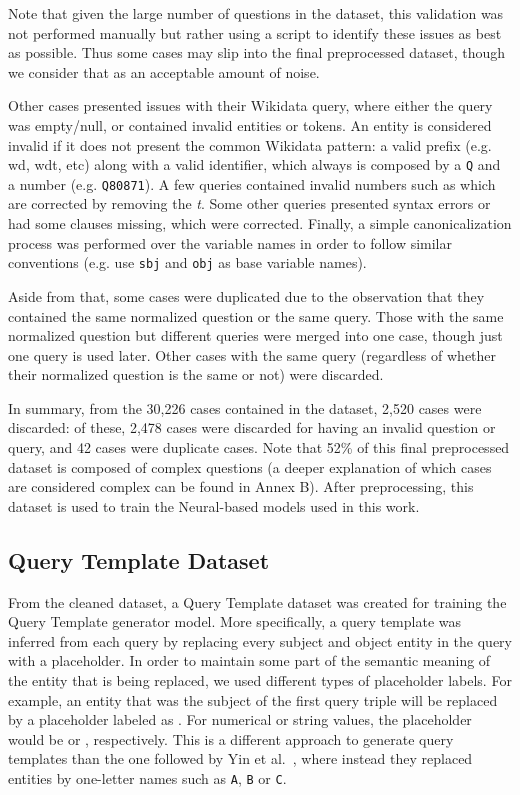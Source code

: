 Note that given the large number of questions in the dataset, this validation was not performed 
manually but rather using a script to identify these issues as best as possible. Thus some cases 
may slip into the final preprocessed dataset, though we consider that as an acceptable amount of 
noise.

Other cases presented issues with their Wikidata \SPARQL{} query, where either the query was 
empty/null, or contained invalid entities or tokens. An entity is considered invalid if it does 
not present the common Wikidata pattern: a valid prefix (e.g. wd, wdt, etc) along with a valid 
identifier, which always is composed by a \texttt{Q} and a number (e.g. \texttt{Q80871}). A few 
queries contained invalid numbers such as  which are corrected by removing the 
\textit{t}. Some other queries presented syntax errors or had some clauses missing, which were 
corrected. Finally, a simple canonicalization process was performed over the variable names in 
order to follow similar conventions (e.g. use \texttt{sbj} and \texttt{obj} as base variable 
names).

Aside from that, some cases were duplicated due to the observation that they contained the same 
normalized question or the same \SPARQL{} query. Those with the same normalized question but 
different \SPARQL{} queries were merged into one case, though just one \SPARQL{} query is used later. 
Other cases with the same \SPARQL{} query (regardless of whether their normalized question is the 
same or not) were discarded.

In summary, from the 30,226 cases contained in the \LCQuADtwo{} dataset, 2,520 cases were 
discarded: of these, 2,478 cases were discarded for having an invalid question or query, and 42 
cases were duplicate cases. Note that 52\% of this final preprocessed dataset is composed of 
complex questions (a deeper explanation of which cases are considered complex can be found in 
Annex B). After preprocessing, this dataset is used to train the Neural-based models used in 
this work.

\subsection{Query Template Dataset}
\label{cap4:experimentalDesign/QaDataset/queryTemplate}
From the cleaned \LCQuADtwo{} dataset, a Query Template dataset was created for training the 
Query Template generator model. More specifically, a query template was inferred from each 
\SPARQL{} query by replacing every subject and object entity in the query with a placeholder. In 
order to maintain some part of the semantic meaning of the entity that is being replaced, we 
used different types of placeholder labels. For example, an entity that was the subject of the 
first query triple will be replaced by a placeholder labeled as . For numerical 
or string values, the placeholder would be  or , respectively. 
This is a different approach to generate query templates than the one followed by 
Yin et al.~\cite{nmt:nl-to-sparql-Yin19}, where instead they replaced entities by one-letter 
names such as \texttt{A}, \texttt{B} or \texttt{C}. 

